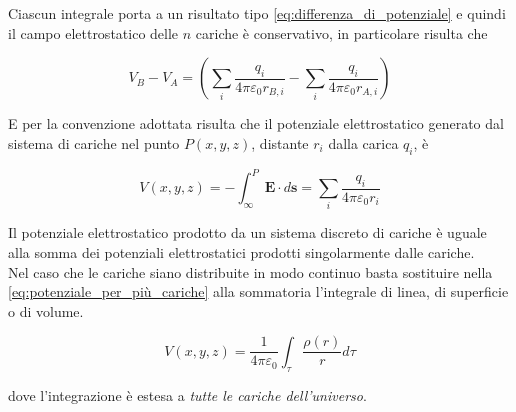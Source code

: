 Ciascun integrale porta a un risultato tipo \ref{eq:differenza_di_potenziale} e quindi il campo elettrostatico delle $n$ cariche è conservativo, in particolare risulta che 

\begin{equation}
    V_B - V_A = (\sum_i \frac{q_i}{4 \pi \varepsilon_0 r_{B,i}} - \sum_i \frac{q_i}{4 \pi \varepsilon_0 r_{A,i}})
\end{equation}

E per la convenzione adottata risulta che il potenziale elettrostatico generato dal sistema di cariche nel punto $P(x,y,z)$, distante $r_i$ dalla carica $q_i$, è 

\begin{tcolorbox}[colback=yellow!10!white, colframe=orange!70!black, boxrule=0.8pt]
\begin{equation}
    V(x,y,z) = - \int_{\infty} ^P \mathbf{E} \cdot d \mathbf{s} = \sum_i \frac{q_i}{4\pi \varepsilon_0r_i}
    \label{eq:potenziale_per_più_cariche}
\end{equation}
\end{tcolorbox}

Il potenziale elettrostatico prodotto da un sistema discreto di cariche è uguale alla somma dei potenziali elettrostatici prodotti singolarmente dalle cariche.\\

Nel caso che le cariche siano distribuite in modo continuo basta sostituire nella \ref{eq:potenziale_per_più_cariche} alla sommatoria l'integrale di linea, di superficie o di volume.

\begin{tcolorbox}[colback=yellow!10!white, colframe=orange!70!black, boxrule=0.8pt]
\begin{equation}
    V(x,y,z) = \frac{1}{4\pi \varepsilon_0} \int _{\tau} \frac{\rho (r)}{r} d\tau
    \label{eq:potenziale_senza_condizione}
\end{equation}
\end{tcolorbox}

dove l'integrazione è estesa a \emph{tutte le cariche dell'universo}.

\newpage
